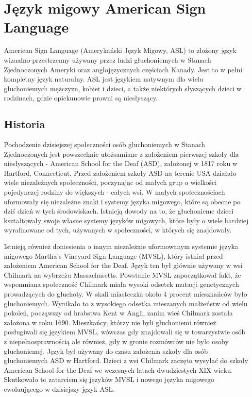 \documentclass[a4paper,12pt,oneside]{book} %
\begin{document}
\chapter{Język migowy American Sign Language}
American Sign Language (Amerykański Język Migowy, ASL) to złożony język wizualno-przestrzenny używany przez ludzi głuchoniemych w Stanach Zjednoczonych Ameryki oraz anglojęzycznych częściach Kanady. Jest to w pełni kompletny język naturalny. ASL jest językiem natywnym dla wielu głuchoniemych mężczyzn, kobiet i dzieci, a także niektórych słyszących dzieci w rodzinach, gdzie opiekunowie prawni są niesłyszący.\cite{nakamura}
\section{Historia}
Pochodzenie dzisiejszej społeczności osób głuchoniemych w Stanach Zjednoczonych jest powszechnie utożsamiane z założeniem pierwszej szkoły dla niesłyszących - American School for the Deaf (ASD), założonej w 1817 roku w Hartford, Connecticut. Przed założeniem szkoły ASD na terenie USA działało wiele niezależnych społeczności, poczynając od małych grup o wielkości pojedynczej rodziny do większych - całych wsi. W małych społecznościach uformowały się niezależne znaki i systemy języka migowego, które są obecne po dziś dzień w tych środowiskach. Istnieją dowody na to, że głuchonieme dzieci kształtowały swoje własne systemy języków migowych, które były o wiele bardziej wyrafinowane od tych, używanych w społeczności, w których się znajdowały.\cite{bahan}

Istnieją również doniesienia o innym niezależnie uformowanym systemie języka migowego Martha’s Vineyard Sign Language (MVSL), który istniał przed założeniem American School for the Deaf. Język ten był głównie używany w wsi Chilmark na wybrzeżu Massachusetts. Powstanie MVSL zapoczątkował fakt, że wspomniana społeczność Chilmark miała wysoki odsetek mutacji genetycznych prowadzących do głuchoty. W skali miasteczka około 4 procent mieszkańców było głuchoniemych. Wynikało to z wysokiego odsetka mieszanych małżeństw od wielu pokoleń, począwszy od hrabstwa Kent w Angli, zanim wieś Chilmark została założona w roku 1690.\cite{groce} Mieszkańcy, którzy nie byli głuchoniemi również posługiwali się językiem MVSL, wówczas gdy znajdowali się w towarzystwie osób z niepełnosprawnością ale również, gdy w gronie rozmówców nie było osoby głuchoniemej. Język był używany do czasu założenia szkoły dla osób głuchoniemych ASD w Hartford. Dzieci z wsi Chilmark zaczęto wysyłać do szkoły American School for the Deaf we wczesnych latach dwudziestych XIX wieku. Skutkowało to zatarciem się języków MVSL i nowego języka migowego ewoluującego w dzisiejszy język ASL.\cite{bahan}
\end{document}
